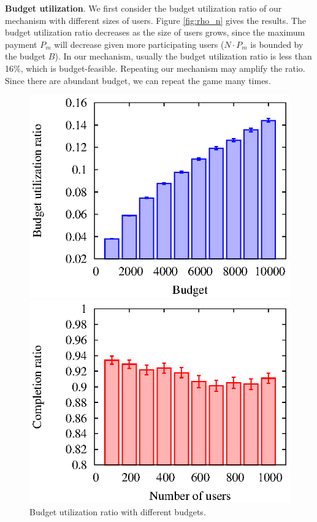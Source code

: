 \documentclass[conference]{IEEEtran}
\theoremstyle{definition}
\begin{document}
{{\bf Budget utilization}. We first consider the budget utilization ratio of our mechanism with different sizes of users. Figure \ref{fig:rho_n} gives the results. The budget utilization ratio decreases as the size of users grows, since the maximum payment $P_m$ will decrease given more participating users ($N\cdot P_m$ is bounded by the budget $B$). In our mechanism, usually the budget utilization ratio is less than 16\%, which is budget-feasible. Repeating our mechanism may amplify the ratio. Since there are abundant budget, we can repeat the game many times.

\begin{figure}[!t]
\centering
\begin{minipage}{0.31\textwidth}
\includegraphics[width=\textwidth]{collusion_resist_codes/images/img_rho_R.eps}
\caption{Budget utilization ratio with different budgets.}
\label{fig:rho_R}
\end{minipage}
\hspace{0.01cm}
\begin{minipage}{0.31\textwidth}
\includegraphics[width=\textwidth]{collusion_resist_codes/images/img_rtask_n.eps}

\end{minipage}
\end{figure}}
\end{document}
